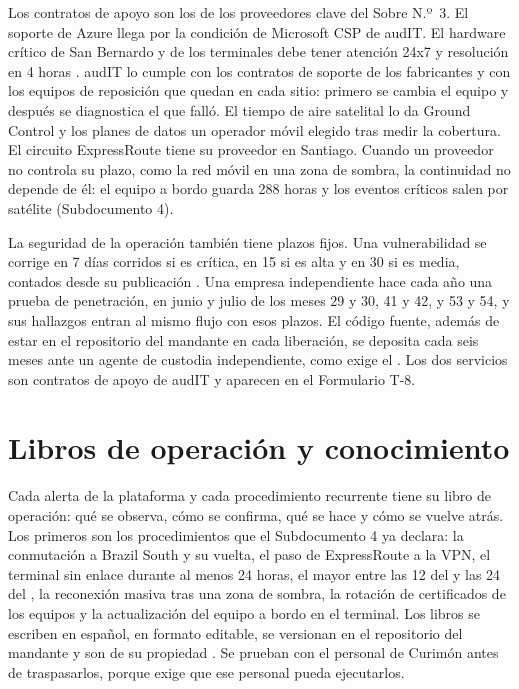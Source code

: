 Los contratos de apoyo son los de los proveedores clave del Sobre N.º~3. El soporte de Azure llega por la
condición de Microsoft CSP de audIT. El hardware crítico de San Bernardo y de los terminales debe tener
atención 24x7 y resolución en 4 horas . audIT lo cumple con los contratos de
soporte de los fabricantes y con los equipos de reposición que quedan en cada sitio: primero se cambia
el equipo y después se diagnostica el que falló. El tiempo de aire satelital lo da Ground Control y los planes de datos un operador móvil
elegido tras medir la cobertura. El circuito ExpressRoute tiene su proveedor en Santiago. Cuando un
proveedor no controla su plazo, como la red móvil en una zona de sombra, la continuidad no depende de
él: el equipo a bordo guarda 288 horas y los eventos críticos salen por satélite (Subdocumento 4).

La seguridad de la operación también tiene plazos fijos. Una vulnerabilidad se corrige en 7 días
corridos si es crítica, en 15 si es alta y en 30 si es media, contados desde su publicación
. Una empresa independiente hace cada año una prueba de penetración, en junio y julio de
los meses 29 y 30, 41 y 42, y 53 y 54, y sus hallazgos entran al mismo flujo con esos plazos. El código
fuente, además de estar en el repositorio del mandante en cada liberación, se deposita cada seis meses
ante un agente de custodia independiente, como exige el . Los dos servicios son contratos
de apoyo de audIT y aparecen en el Formulario T-8.

\section{Libros de operación y conocimiento}\label{sec:10-libros-de-operacion-y-conocimien}

Cada alerta de la plataforma y cada procedimiento recurrente tiene su libro de operación: qué se
observa, cómo se confirma, qué se hace y cómo se vuelve atrás. Los primeros son los procedimientos que
el Subdocumento 4 ya declara: la conmutación a Brazil South y su vuelta, el paso de ExpressRoute a la
VPN, el terminal sin enlace durante al menos 24 horas, el mayor entre las 12 del  y
las 24 del , la reconexión masiva tras una zona de sombra, la rotación
de certificados de los equipos y la actualización del equipo a bordo en el terminal. Los libros se
escriben en español, en formato editable, se versionan en el repositorio del mandante y son de su
propiedad . Se prueban con el personal de Curimón antes de traspasarlos, porque
 exige que ese personal pueda ejecutarlos.


